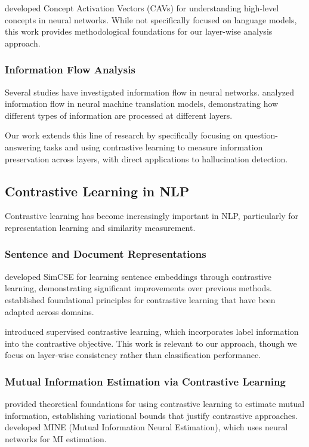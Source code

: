 \citet{kim2018interpretability} developed Concept Activation Vectors (CAVs) for understanding high-level concepts in neural networks. While not specifically focused on language models, this work provides methodological foundations for our layer-wise analysis approach.

\subsubsection{Information Flow Analysis}
Several studies have investigated information flow in neural networks. \citet{voita2019information} analyzed information flow in neural machine translation models, demonstrating how different types of information are processed at different layers.

Our work extends this line of research by specifically focusing on question-answering tasks and using contrastive learning to measure information preservation across layers, with direct applications to hallucination detection.

\subsection{Contrastive Learning in NLP}
\label{subsec:contrastive_nlp}

Contrastive learning has become increasingly important in NLP, particularly for representation learning and similarity measurement.

\subsubsection{Sentence and Document Representations}
\citet{gao2021simcse} developed SimCSE for learning sentence embeddings through contrastive learning, demonstrating significant improvements over previous methods. \citet{chen2020simclr} established foundational principles for contrastive learning that have been adapted across domains.

\citet{khosla2020supervised} introduced supervised contrastive learning, which incorporates label information into the contrastive objective. This work is relevant to our approach, though we focus on layer-wise consistency rather than classification performance.

\subsubsection{Mutual Information Estimation via Contrastive Learning}
\citet{poole2019variational} provided theoretical foundations for using contrastive learning to estimate mutual information, establishing variational bounds that justify contrastive approaches. \citet{belghazi2018mutual} developed MINE (Mutual Information Neural Estimation), which uses neural networks for MI estimation.

